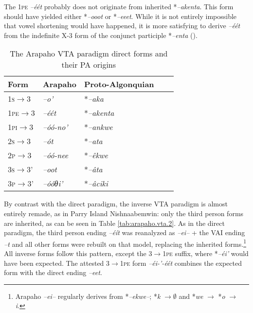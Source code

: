 \documentclass[twoside,a4paper,11pt]{article}
\newcommand{\ipa}[1]{{\phon\textit{#1}}}
\newcommand{\grise}[1]{\cellcolor{lightgray}\textbf{#1}}
\newcommand{\Σ}{\greek{Σ}}
\begin{document}
The \textsc{1pe} \ipa{--éét} probably does not originate from inherited  *\ipa{--akenta}. This form should have yielded  either *\ipa{--ooot} or *\ipa{--eeet}. While it is not entirely impossible that vowel shortening would have happened, it is more satisfying to derive  \ipa{--éét}  from the indefinite X-3 form of the conjunct participle  *\ipa{--enta} (\citealt{goddard98morphology.arapaho}).

\begin{table}[H]
\caption{The Arapaho VTA paradigm direct forms and their PA origins}
\centering \label{tab:arapaho.vta.1}
\begin{tabular}{lllll}
\toprule
Form& Arapaho & Proto-Algonquian \\
\midrule
 \textsc{1s}$\rightarrow$3 & 	\ipa{--o'} & 	*\ipa{--aka} & 		\\		
\textsc{1pe}$\rightarrow$3 & 	\ipa{--éét}\grise{} & 	 *\ipa{--akenta} & 		\\		
\textsc{1pi}$\rightarrow$3 & 	\ipa{--óó-no'}\grise{} & *\ipa{--ankwe} & 		\\		
\midrule
\textsc{2s}$\rightarrow$3 & 	\ipa{--ót} & 	*\ipa{--ata} & 		\\		
\textsc{2p}$\rightarrow$3 & 	\ipa{--óó-nee} \grise{}& *\ipa{--êkwe} & 		\\		
\midrule
\textsc{3s}$\rightarrow$3' & 	\ipa{--oot} & 	*\ipa{--âta} & 		\\		
\textsc{3p}$\rightarrow$3' & 	\ipa{--óóθi'} & 	*\ipa{--âciki} & 		\\		
\bottomrule
\end{tabular}
\end{table}

By contrast with the direct paradigm, the inverse   VTA paradigm is almost entirely remade, as in Parry Island Nishnaabemwin: only the third person forms are inherited, as can be seen in Table \ref{tab:arapaho.vta.2}. As in the direct paradigm, the third person ending \ipa{--éít} was reanalyzed as \ipa{--ei--} + the VAI ending \ipa{--t} and all other forms were rebuilt on that model, replacing the inherited forms.\footnote{Arapaho \ipa{--ei--} regularly derives from *\ipa{--ekwe--}; *\ipa{k} $\rightarrow \emptyset $ and *\ipa{we} $\rightarrow $ *\ipa{o} $\rightarrow $ \ipa{i}. } All inverse forms follow this pattern, except the \textsc{3$\rightarrow$1pe} suffix, where *\ipa{--éi'} would have been expected. The attested \textsc{3$\rightarrow$1pe} form \ipa{--éi-'-éét} combines the expected form with the direct ending \ipa{--eet}.
\end{document}
